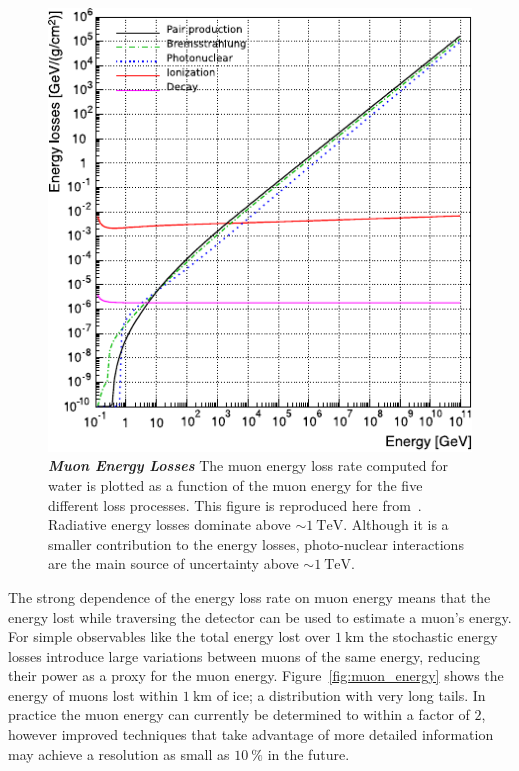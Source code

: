 \begin{figure}
	\centering
	\includegraphics[width=0.8\linewidth]{figures/energy_losses}
	\caption{\textbf{\textit{Muon Energy Losses}}
		The muon energy loss rate computed for water is plotted as a function of the muon energy for the five different loss processes.
		This figure is reproduced here from~\cite{Koehne:2013gpa}.
		Radiative energy losses dominate above $\sim\SI{1}\TeV$.
		Although it is a smaller contribution to the energy losses, photo-nuclear interactions are the main source of uncertainty above $\sim\SI{1}\TeV$.
	}\label{fig:energy_losses}
\end{figure}

The strong dependence of the energy loss rate on muon energy means that the energy lost while traversing the detector can be used to estimate a muon's energy.
For simple observables like the total energy lost over $\SI{1}\km$ the stochastic energy losses introduce large variations between muons of the same energy, reducing their power as a proxy for the muon energy.
Figure~\ref{fig:muon_energy} shows the energy of muons lost within $\SI{1}\km$ of ice; a distribution with very long tails.
In practice the muon energy can currently be determined to within a factor of $2$, however improved techniques that take advantage of more detailed information may achieve a resolution as small as $\SI{10}\percent$ in the future.

